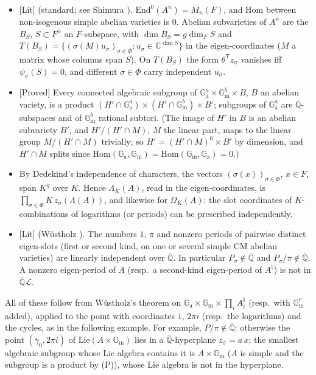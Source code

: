 \documentclass[11pt]{amsart}
\theoremstyle{definition}
\newcommand{\Qb}{\overline{\mathbb{Q}}}
\newcommand{\C}{\mathbb{C}}
\newcommand{\Ga}{\mathbb{G}_{\mathrm a}}
\newcommand{\Gm}{\mathbb{G}_{\mathrm m}}
\newcommand{\Lg}{\mathcal{L}}
\newcommand{\lab}[1]{\textup{[#1]}}
\begin{document}
\begin{itemize}
\item[(S1)] \lab{Lit} (standard; see Shimura \cite{Sh98}). $\mathrm{End}^0(A^n)=M_n(F)$, and $\mathrm{Hom}$ between non-isogenous simple
abelian varieties is $0$. Abelian subvarieties of $A^n$ are the $B_S$, $S\subset F^n$ an $F$-subspace, with
$\dim B_S=g\dim_FS$ and $T(B_S)=\{(\sigma(M)u_\sigma)_{\sigma\in\Phi}:u_\sigma\in\C^{\dim S}\}$ in the eigen-coordinates
($M$ a matrix whose columns span $S$). On $T(B_S)$ the form $\theta^{\mathsf T}z_\sigma$ vanishes iff $\psi_\sigma(S)=0$,
and different $\sigma\in\Phi$ carry independent $u_\sigma$.
\item[(P)] \lab{Proved} Every connected algebraic subgroup of $\Ga^a\times\Gm^b\times B$, $B$ an abelian variety, is a
product $(H'\cap\Ga^a)\times(H'\cap\Gm^b)\times B'$; subgroups of $\Ga^a$ are $\Qb$-subspaces and of $\Gm^b$ rational
subtori. (The image of $H'$ in $B$ is an abelian subvariety $B'$, and $H'/(H'\cap M)$, $M$ the linear part, maps to the
linear group $M/(H'\cap M)$ trivially; so $H'=(H'\cap M)^0\times B'$ by dimension, and $H'\cap M$ splits since
$\mathrm{Hom}(\Ga,\Gm)=\mathrm{Hom}(\Gm,\Ga)=0$.)
\item[(Ch)] By Dedekind's independence of characters, the vectors $(\sigma(x))_{\sigma\in\Phi}$, $x\in F$, span $K^g$ over
$K$. Hence $\Lambda_K(A)$, read in the eigen-coordinates, is $\prod_{\sigma\in\Phi}K\,z_\sigma(\Lambda(A))$, and likewise
for $\Omega_K(A)$: the slot coordinates of $K$-combinations of logarithms (or periods) can be prescribed independently.
\item[(W)] \lab{Lit} (W\"ustholz \cite{Wu89}). The numbers $1$, $\pi$ and nonzero periods of pairwise distinct
eigen-slots (first or second kind, on one or several simple CM abelian varieties) are linearly independent
over $\Qb$. In particular $P_\sigma\notin\Qb$ and $P_\sigma/\pi\notin\Qb$. A nonzero eigen-period of $A$ (resp.\ a
second-kind eigen-period of $A^\natural$) is not in $\Qb\Lg$.
\end{itemize}
All of these follow from W\"ustholz's theorem on $\Ga\times\Gm\times\prod_iA_i^\natural$ (resp.\ with $\Gm^r$ added), applied to
the point with coordinates $1$, $2\pi i$ (resp.\ the logarithms) and the cycles, as in the following example. For example, $P/\pi\notin\Qb$: otherwise the point $(\gamma_0,2\pi i)$ of $\mathrm{Lie}(A\times\Gm)$ lies in a
$\Qb$-hyperplane $z_\sigma=a\,x$; the smallest algebraic subgroup whose Lie algebra contains it is $A\times\Gm$ ($A$ is
simple and the subgroup is a product by (P)), whose Lie algebra is not in the hyperplane.
\end{document}
